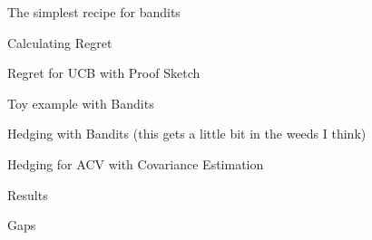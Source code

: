 \documentclass[usenames,dvipsnames]{beamer}
\theoremstyle{definition}
\begin{document}
\begin{frame}{The simplest recipe for bandits}

\end{frame}

\begin{frame}{Calculating Regret}
  
\end{frame}

\begin{frame}{Regret for UCB with Proof Sketch}
  
\end{frame}

\begin{frame}{Toy example with Bandits}
  
\end{frame}

\begin{frame}{Hedging with Bandits}
(this gets a little bit in the weeds I think)
  
\end{frame}

\begin{frame}{Hedging for ACV with Covariance Estimation}
  
\end{frame}

\begin{frame}{Results}
  
\end{frame}

\begin{frame}{Gaps}
  
\end{frame}



\end{document}
